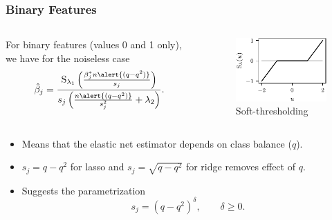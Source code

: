 \documentclass[10pt]{beamer}
\begin{document}
\begin{frame}[c]
  \frametitle{Binary Features}

  \begin{columns}
    \begin{column}{0.45\textwidth}

      For binary features (values 0 and 1 only), we have for the noiseless case
      \[
        \hat{\beta}_j =
        \frac{\operatorname{S}_{\lambda_1}\left(\frac{\beta_j^* n \alert{(q - q^2)}}{s_j}\right)}{s_j\left(\frac{n\alert{(q - q^2)}}{s_j^2} + \lambda_2\right)}.
      \]
    \end{column}
    \begin{column}{0.45\textwidth}
      \begin{figure}[htpb]
        \centering
        \includegraphics[]{figures/paper6-st.pdf}
        \caption{%
          Soft-thresholding
        }
      \end{figure}
    \end{column}
  \end{columns}

  \pause

  \begin{itemize}[<+->]
    \item Means that the elastic net estimator depends on class balance (\(q\)).
    \item \(s_j = q - q^2\) for lasso and \(s_j = \sqrt{q-q^2}\) for ridge removes effect of \(q\).
    \item Suggests the parametrization
          \[
            s_j = (q - q^2)^\delta, \qquad \delta \geq 0.
          \]
  \end{itemize}
\end{frame}
\end{document}
